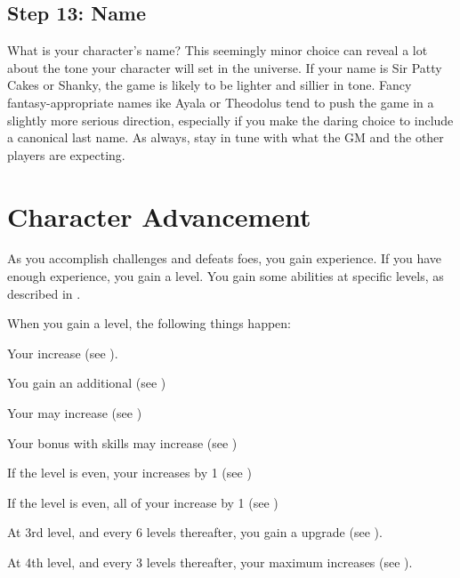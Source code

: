     \subsection{Step 13: Name}
        What is your character's name?
        This seemingly minor choice can reveal a lot about the tone your character will set in the universe.
        If your name is Sir Patty Cakes or Shanky, the game is likely to be lighter and sillier in tone.
        Fancy fantasy-appropriate names ike Ayala or Theodolus tend to push the game in a slightly more serious direction, especially if you make the daring choice to include a canonical last name.
        As always, stay in tune with what the GM and the other players are expecting.

\section{Character Advancement}\label{Character Advancement}

    As you accomplish challenges and defeats foes, you gain experience.
    If you have enough experience, you gain a level.
    You gain some abilities at specific levels, as described in .

    When you gain a level, the following things happen:
    \begin{raggeditemize}
        \item Your  increase (see ).
        \item You gain an additional  (see )
        \item Your  may increase (see )
        \item Your bonus with  skills may increase (see )
        \item If the level is even, your  increases by 1 (see )
        \item If the level is even, all of your  increase by 1 (see )
        \item At 3rd level, and every 6 levels thereafter, you gain a  upgrade (see ).
        \item At 4th level, and every 3 levels thereafter, your maximum  increases (see ).
    \end{raggeditemize}

